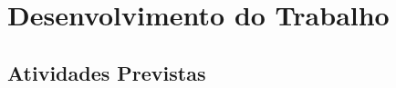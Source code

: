 \chapter{Desenvolvimento do Trabalho} \label{cap:desenvolvimento}
\section{Atividades Previstas}














